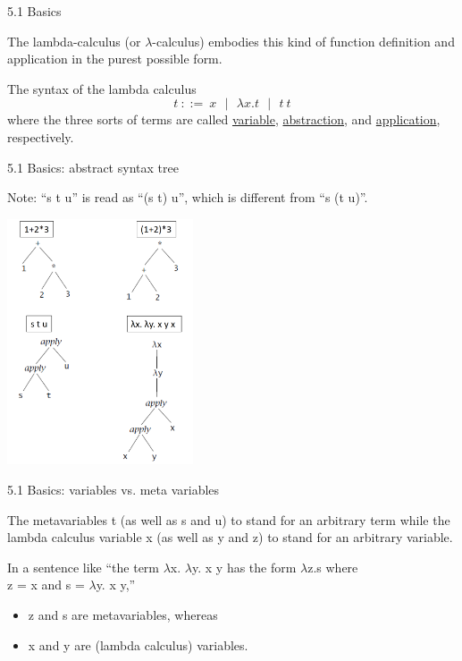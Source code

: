 \documentclass[table]{beamer}
\begin{document}
\begin{frame}[t]{5.1 Basics} \vspace{10pt}

The lambda-calculus (or $\lambda$-calculus) embodies this kind of function definition and application in the purest possible form. 

\vspace{10pt}

The syntax of the lambda calculus
\[
t \ ::= \ x \ \ \ | \ \ \ \lambda x. t \ \ \ | \ \ \ t \ t 
\]
where the three sorts of terms are called \underline{variable}, \underline{abstraction}, and \underline{application}, respectively.

\end{frame}

\begin{frame}[t]{5.1 Basics: abstract syntax tree} 

Note: ``s t u'' is read as ``(s t) u'', which is different from ``s (t u)''.

\begin{center}
\includegraphics[width=5.5cm]{abstract_syntax_ch5}
\end{center}

\end{frame}

\begin{frame}[t]{5.1 Basics: variables vs. meta variables} 

The metavariables t (as well as s and u) to stand for an arbitrary term while the lambda calculus variable x (as well as y and z) to stand for an arbitrary variable. 

\vspace{10pt}

In a sentence like ``the term $\lambda$x. $\lambda$y. x y has the form $\lambda$z.s where \\ z = x and s = $\lambda$y. x y,''
\begin{itemize}
\item z and s are metavariables, whereas 
\item x and y are (lambda calculus) variables. 
\end{itemize}

\end{frame}
\end{document}
